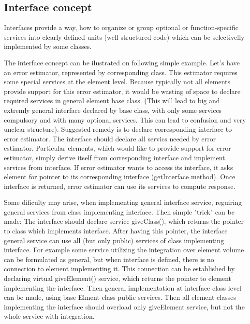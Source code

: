 \documentclass[12pt,draft]{article}
\begin{document}
\subsection{Interface concept}
Interfaces provide a way, how to organize or group optional or function-specific services into 
clearly defined units (well structured code) which can be
selectivelly implemented by some classes.

The interface concept can be ilustrated on following simple example. 
Let's have an error estimator, represented by corresponding class. This estimator requires some special 
services at the element level. Because typically not all elements provide support for this error estimator,
it would be wasting of space to declare required services in general element base class.
(This will lead to big and extremly general interface declared by base class, 
with only some services compulsory and with many optional services. This can lead to confusion and very unclear structure).
Suggested remedy is to declare corresponding interface to error estimator. The interface 
should declare all servics needed by error estimator. Particular elements, which would like to provide support for
error estimator, simply derive itself from corresponding interface and implement services from interface.
If error estimator wants to access its interface, it asks element for pointer to its corresponding interface
(getInterface method). Once interface is returned, error estimator can use its services to compute response.

Some dificulty may arise, when implementing general interface service, reguiring general services
from class implementing interface. Then simple "trick" can be made:
The interface should declare service giveClass(), which returns the pointer to class which implements interface.
After having this pointer, the interface general service can use all (but only public) services of class implementing
interface. For example some service utilizing the integration over element volume can be formulated as general,
but when interface is defined, there is no connection to element implementing it. This connection can be established
by declaring virtual giveElement() service, which returns the pointer to element implementing the interface. 
Then general implementation at interface class level can be made, using base Elment class public services. 
Then all element classes implementing the interface should overload only giveElement service, but not the whole 
service with integration.
\end{document}
